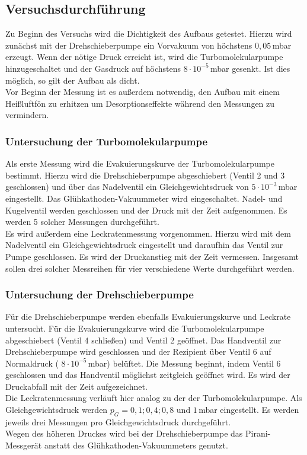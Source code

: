 \subsection{Versuchsdurchführung}
Zu Beginn des Versuchs wird die Dichtigkeit des Aufbaus getestet. Hierzu wird zunächst mit der Drehschieberpumpe ein Vorvakuum von höchstens $0,05$\,\si{\milli\bar} erzeugt. Wenn der nötige Druck erreicht
ist, wird die Turbomolekularpumpe hinzugeschaltet und der Gasdruck auf höchstens $8 \cdot 10^{-5}$\,\si{\milli\bar} gesenkt. Ist dies möglich, so gilt der Aufbau als dicht.\\
Vor Beginn der Messung ist es außerdem notwendig, den Aufbau mit einem Heißluftfön zu erhitzen um Desorptionseffekte während den Messungen zu vermindern.
\subsubsection{Untersuchung der Turbomolekularpumpe}
Als erste Messung wird die Evakuierungskurve der Turbomolekularpumpe bestimmt. Hierzu wird die Drehschieberpumpe abgeschiebert (Ventil 2 und 3 geschlossen) und über das Nadelventil ein Gleichgewichtsdruck von
$5 \cdot 10^{-3}$\,\si{\milli\bar} eingestellt. Das Glühkathoden-Vakuummeter wird eingeschaltet. Nadel- und Kugelventil werden geschlossen und der Druck mit der Zeit aufgenommen. Es werden 5 solcher Messungen
durchgeführt.\\
Es wird außerdem eine Leckratenmessung vorgenommen. Hierzu wird mit dem Nadelventil ein Gleichgewichtsdruck eingestellt und daraufhin das Ventil zur Pumpe geschlossen. Es wird
der Druckanstieg mit der Zeit vermessen. Insgesamt sollen drei solcher Messreihen für vier verschiedene Werte durchgeführt werden.
\subsubsection{Untersuchung der Drehschieberpumpe}
Für die Drehschieberpumpe werden ebenfalls Evakuierungskurve und Leckrate untersucht. Für die Evakuierungskurve wird die Turbomolekularpumpe abgeschiebert (Ventil 4 schließen) und Ventil 2 geöffnet.
Das Handventil zur Drehschieberpumpe wird geschlossen und der Rezipient über Ventil 6 auf Normaldruck ( $8 \cdot 10^{-5}$\,\si{\milli\bar}) belüftet. Die Messung beginnt, indem Ventil 6 geschlossen und das Handventil
möglichst zeitgleich geöffnet wird. Es wird der Druckabfall mit der Zeit aufgezeichnet.\\
Die Leckratenmessung verläuft hier analog zu der der Turbomolekularpumpe. Als Gleichgewichtsdruck werden  $p_G=0,1;0,4;0,8 \text{ und } 1 $\,\si{\milli\bar} eingestellt. Es werden jeweils drei Messungen
pro Gleichgewichtsdruck durchgeführt.\\
Wegen des höheren Druckes wird bei der Drehschieberpumpe das Pirani-Messgerät anstatt des Glühkathoden-Vakuummeters genutzt.
\newpage
